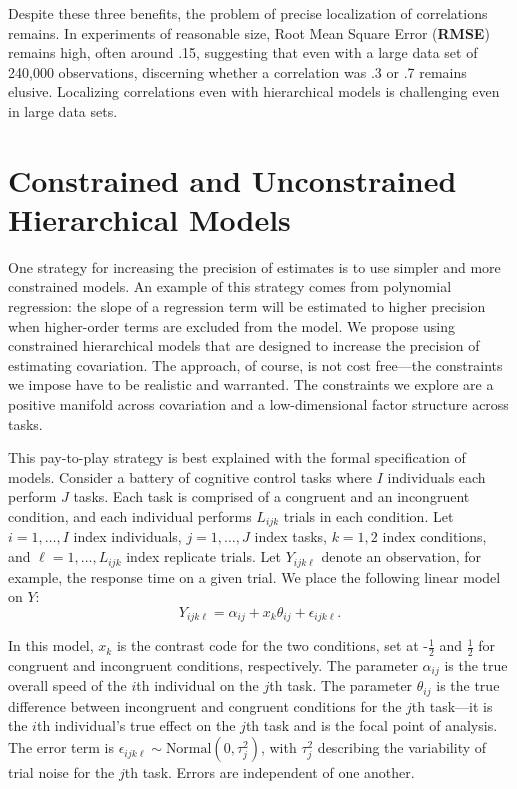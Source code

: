 \documentclass[man, 12pt]{apa7} %
\begin{document}
Despite these three benefits, the problem of precise localization of correlations remains.  In experiments of reasonable size, Root Mean Square Error (\textbf{RMSE}) remains high, often around .15, suggesting that even with a large data set of 240,000 observations, discerning whether a correlation was .3 or .7 remains elusive.  Localizing correlations even with hierarchical models is challenging even in large data sets.


\section{Constrained and Unconstrained Hierarchical Models}

One strategy for increasing the precision of estimates is to use simpler and more constrained models.  An example of this strategy comes from polynomial regression: the slope of a regression term will be estimated to higher precision when higher-order terms are excluded from the model.  We propose using constrained hierarchical models that are designed to increase the precision of estimating covariation.  The approach, of course, is not cost free---the constraints we impose have to be realistic and warranted.  The constraints we explore are a positive manifold across covariation and a low-dimensional factor structure across tasks.

This pay-to-play strategy is best explained with the formal specification of models.  Consider a battery of cognitive control tasks where $I$ individuals each perform $J$ tasks. Each task is comprised of a congruent and an incongruent condition, and each individual performs $L_{ijk}$ trials in each condition. Let $i=1,\ldots,I$ index individuals, $j=1,\ldots,J$ index tasks, $k=1,2$ index conditions, and $\ell=1,\ldots,L_{ijk}$ index replicate trials. Let $Y_{ijk\ell}$ denote an observation, for example, the response time on a given trial.  We place the following linear model on $Y$:
\begin{equation} \label{eq:RT_surface}
Y_{ijk\ell} = \alpha_{ij} + x_k\theta_{ij} + \epsilon_{ijk\ell}.
\end{equation}

In this model, $x_k$ is the contrast code for the two conditions, set at -$\frac{1}{2}$ and $\frac{1}{2}$ for congruent and incongruent conditions, respectively. The parameter $\alpha_{ij}$ is the true overall speed of the $i$th individual on the $j$th task. The parameter $\theta_{ij}$ is the true difference between incongruent and congruent conditions for the $j$th task---it is the $i$th individual's true effect on the $j$th task and is the focal point of analysis.  The error term is $\epsilon_{ijk\ell} \sim \mbox{Normal}(0,\tau_j^2)$, with $\tau_j^2$ describing the variability of trial noise for the $j$th task. Errors are independent of one another. 
\end{document}
